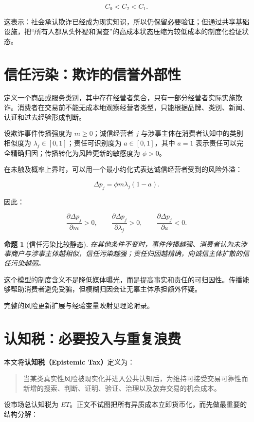\documentclass[UTF8,12pt]{ctexart}
\newtheorem{proposition}{命题}
\begin{document}
\[
\boxed{C_0<C_2<C_1}.
\]

这表示：社会承认欺诈已经成为现实知识，所以仍保留必要验证；但通过共享基础设施，把“所有人都从头怀疑和调查”的高成本状态压缩为较低成本的制度化验证状态。

\section{信任污染：欺诈的信誉外部性}

定义一个商品或服务类别，其中存在经营者集合，只有一部分经营者实际实施欺诈。消费者在交易前不能无成本地观察经营者类型，只能根据品牌、类别、新闻、认证和过去经验形成判断。

设欺诈事件传播强度为 $m\geq0$；诚信经营者 $j$ 与涉事主体在消费者认知中的类别相似度为 $\lambda_j\in[0,1]$；责任可识别度为 $a\in[0,1]$，其中 $a=1$ 表示责任可以完全精确归因；传播转化为风险更新的敏感度为 $\phi>0$。

在未触及概率上界时，可以用一个最小约化式表达诚信经营者受到的风险外溢：

\[
\Delta p_j=\phi m\lambda_j(1-a).
\]

因此：

\[
\frac{\partial \Delta p_j}{\partial m}>0,\qquad
\frac{\partial \Delta p_j}{\partial \lambda_j}>0,\qquad
\frac{\partial \Delta p_j}{\partial a}<0.
\]

\begin{proposition}[信任污染比较静态]
在其他条件不变时，事件传播越强、消费者认为未涉事商户与涉事主体越相似，信任污染越强；责任归因越精确，向诚信主体扩散的信任污染越弱。
\end{proposition}

这个模型的制度含义不是降低媒体曝光，而是提高事实和责任的可归因性。传播能够帮助消费者避免受骗，但模糊归因会让无辜主体承担额外怀疑。

完整的风险更新扩展与经验变量映射见理论附录。

\section{认知税：必要投入与重复浪费}

本文将\textbf{认知税（Epistemic Tax）}定义为：

\begin{quote}
当某类真实性风险被现实化并进入公共认知后，为维持可接受交易可靠性而新增的搜索、判断、证明、验证、治理以及放弃交易的机会成本。
\end{quote}

设市场总认知税为 $ET$。正文不试图把所有异质成本立即货币化，而先做最重要的结构分解：
\end{document}
